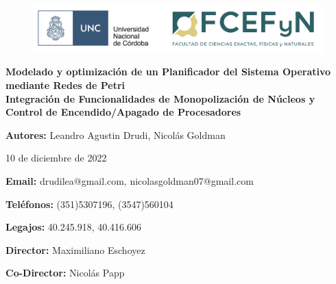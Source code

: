 \begin{titlepage}
    \begin{center}
        \vspace*{1cm}

        \begin{figure}
            \centering
            \begin{minipage}[t]{\textwidth}\centering
                \includegraphics[width=1\textwidth]{images/color_UNC-FCEFyN.png}
            \end{minipage}\hfill
        \end{figure}

        \huge
        \textbf{Modelado y optimización de un Planificador del Sistema Operativo mediante Redes de Petri} \\

        \vspace{.5cm}
        \large
        \textbf{Integración de Funcionalidades de Monopolización de Núcleos y Control de Encendido/Apagado de Procesadores} \\

        \vspace{2cm}

        \Large
        \textbf{Autores:} Leandro Agustin Drudi, Nicolás Goldman

        \vspace{.5cm}

        \large
        10 de diciembre de 2022

        \vspace{1.5cm}

        \normalsize
        \textbf{Email:} drudilea@gmail.com, nicolasgoldman07@gmail.com

        \vspace{.5cm}

        \textbf{Teléfonos:} (351)5307196, (3547)560104

        \vspace{.5cm}

        \textbf{Legajos:} 40.245.918, 40.416.606

        \vspace{1.5cm}

        \textbf{Director:} Maximiliano Eschoyez

        \vspace{.5cm}

        \textbf{Co-Director:} Nicolás Papp

        \vspace{1cm}


        \vspace{0.5cm}

        \vfill

    \end{center}
\end{titlepage}